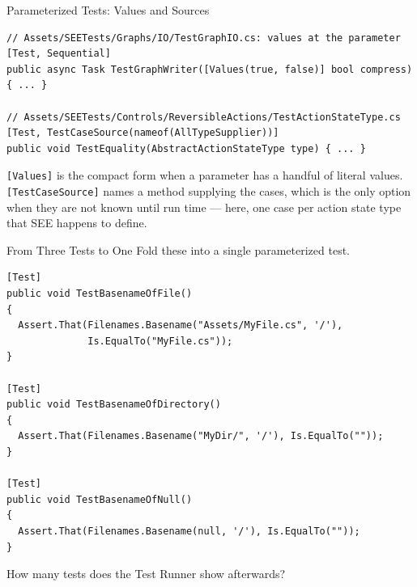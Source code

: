 \begin{frame}[fragile]{Parameterized Tests: Values and Sources}
  \begin{lstlisting}[basicstyle=\scriptsize\ttfamily]
// Assets/SEETests/Graphs/IO/TestGraphIO.cs: values at the parameter
[Test, Sequential]
public async Task TestGraphWriter([Values(true, false)] bool compress)
{ ... }

// Assets/SEETests/Controls/ReversibleActions/TestActionStateType.cs
[Test, TestCaseSource(nameof(AllTypeSupplier))]
public void TestEquality(AbstractActionStateType type) { ... }
  \end{lstlisting}
  \vspace{1ex}

  \texttt{[Values]} is the compact form when a parameter has a handful of
  literal values. \texttt{[TestCaseSource]} names a method supplying the cases,
  which is the only option when they are not known until run time --- here, one
  case per action state type that SEE happens to define.
  \vspace{1ex}

\end{frame}

\begin{exerciseframe}{From Three Tests to One}
  Fold these into a single parameterized test.
  \vspace{1ex}

  \begin{lstlisting}[basicstyle=\scriptsize\ttfamily]
[Test]
public void TestBasenameOfFile()
{
  Assert.That(Filenames.Basename("Assets/MyFile.cs", '/'),
              Is.EqualTo("MyFile.cs"));
}

[Test]
public void TestBasenameOfDirectory()
{
  Assert.That(Filenames.Basename("MyDir/", '/'), Is.EqualTo(""));
}

[Test]
public void TestBasenameOfNull()
{
  Assert.That(Filenames.Basename(null, '/'), Is.EqualTo(""));
}
  \end{lstlisting}
  \vspace{1ex}

  How many tests does the Test Runner show afterwards?
\end{exerciseframe}

